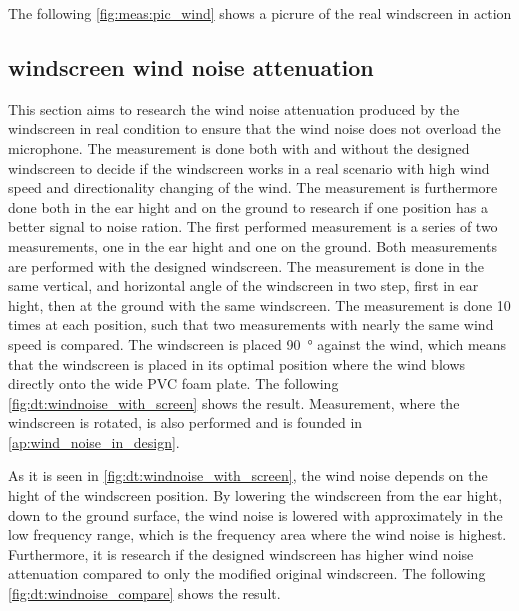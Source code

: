 
The following \autoref{fig:meas:pic_wind} shows a picrure of the real windscreen in action 




\subsection{windscreen wind noise attenuation}\label{sec:ds:wind_noi_att}
This section aims to research the wind noise attenuation produced by the windscreen in real condition to ensure that the wind noise does not overload the microphone. The measurement is done both with and without the designed windscreen to decide if the windscreen works in a real scenario with high wind speed and directionality changing of the wind. The measurement is furthermore done both in the ear hight and on the ground to research if one position has a better signal to noise ration. The first performed measurement is a series of two measurements, one in the ear hight and one on the ground. Both measurements are performed with the designed windscreen. The measurement is done in the same vertical, and horizontal angle of the windscreen in two step, first in ear hight, then at the ground with the same windscreen. The measurement is done 10 times at each position, such that two measurements with nearly the same wind speed is compared. The windscreen is placed \SI{90}{\degree} against the wind, which means that the windscreen is placed in its optimal position where the wind blows directly onto the wide PVC foam plate. The following \autoref{fig:dt:windnoise_with_screen} shows the result. Measurement, where the windscreen is rotated, is also performed and is founded in \autoref{ap:wind_noise_in_design}.


As it is seen in \autoref{fig:dt:windnoise_with_screen}, the wind noise depends on the hight of the windscreen position. By lowering the windscreen from the ear hight, down to the ground surface, the wind noise is lowered with approximately  in the low frequency range, which is the frequency area where the wind noise is highest. Furthermore, it is research if the designed windscreen has higher wind noise attenuation compared to only the modified original windscreen. The following \autoref{fig:dt:windnoise_compare} shows the result.
 
